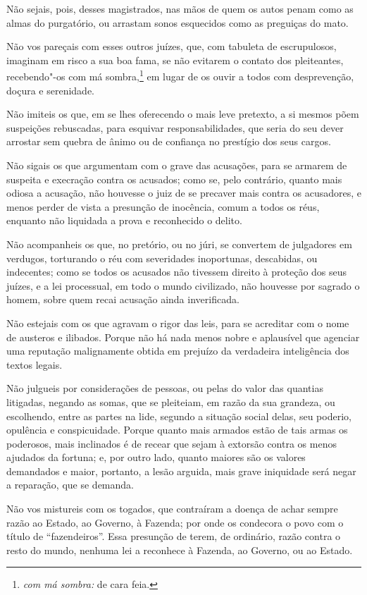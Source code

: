 Não sejais, pois, desses magistrados, nas mãos de quem os autos
penam como as almas do purgatório, ou arrastam sonos esquecidos como as
preguiças do mato.

Não vos pareçais com esses outros juízes, que, com tabuleta de
escrupulosos, imaginam em risco a sua boa fama, se não evitarem o
contato dos pleiteantes, recebendo"-os com má sombra,\footnote{ \textit{com má sombra:} 
de cara feia.} em lugar de os
ouvir a todos com desprevenção, doçura e serenidade.

Não imiteis os que, em se lhes oferecendo o mais leve pretexto, a
si mesmos põem suspeições rebuscadas, para esquivar responsabilidades,
que seria do seu dever arrostar sem quebra de ânimo ou de confiança no
prestígio dos seus cargos.

Não sigais os que argumentam com o grave das acusações, para se
armarem de suspeita e execração contra os acusados; como se, pelo
contrário, quanto mais odiosa a acusação, não houvesse o juiz de se
precaver mais contra os acusadores, e menos perder de vista a presunção
de inocência, comum a todos os réus, enquanto não liquidada a prova e
reconhecido o delito.

Não acompanheis os que, no pretório, ou no júri, se convertem de
julgadores em verdugos, torturando o réu com severidades inoportunas,
descabidas, ou indecentes; como se todos os acusados não tivessem
direito à proteção dos seus juízes, e a lei processual, em todo o mundo
civilizado, não houvesse por sagrado o homem, sobre quem recai acusação
ainda inverificada.

Não estejais com os que agravam o rigor das leis, para se
acreditar com o nome de austeros e ilibados. Porque não há nada menos
nobre e aplausível que agenciar uma reputação malignamente obtida em
prejuízo da verdadeira inteligência dos textos legais.

Não julgueis por considerações de pessoas, ou pelas do valor das
quantias litigadas, negando as somas, que se pleiteiam, em razão da sua
grandeza, ou escolhendo, entre as partes na lide, segundo a situação
social delas, seu poderio, opulência e conspicuidade. Porque quanto
mais armados estão de tais armas os poderosos, mais inclinados é de
recear que sejam à extorsão contra os menos ajudados da fortuna; e, por
outro lado, quanto maiores são os valores demandados e maior, portanto,
a lesão arguida, mais grave iniquidade será negar a reparação, que se
demanda.

Não vos mistureis com os togados, que contraíram a doença de achar
sempre razão ao Estado, ao Governo, à Fazenda; por onde os condecora o
povo com o título de ``fazendeiros''. Essa
presunção de terem, de ordinário, razão contra o resto do mundo,
nenhuma lei a reconhece à Fazenda, ao Governo, ou ao Estado.

